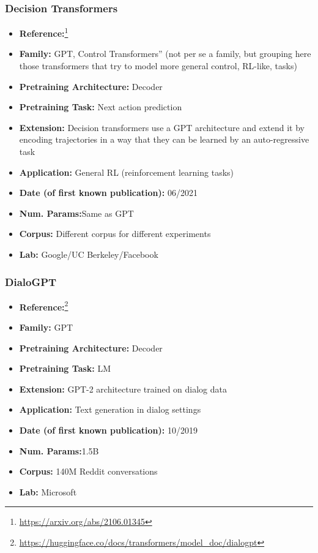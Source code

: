 \documentclass{article}
\begin{document}
\subsubsection{Decision Transformers}

            \begin{itemize}
                \item \textbf{Reference:}\footnote{\url{https://arxiv.org/abs/2106.01345}}\cite{chen2021decision}
                \item \textbf{Family:} GPT, Control Transformers” (not per se a family, but grouping here those transformers that try to model more general control, RL-like, tasks) 
                \item \textbf{Pretraining Architecture:} Decoder
                \item \textbf{Pretraining Task:} Next action prediction
                \item \textbf{Extension:} Decision transformers use a GPT architecture and extend it by encoding trajectories in a way that they can be learned by an auto-regressive task  
                \item \textbf{Application:} General RL (reinforcement learning tasks)
                \item \textbf{Date (of first known publication):} 06/2021
                \item \textbf{Num. Params:}Same as GPT
                \item \textbf{Corpus:} Different corpus for different experiments
                \item \textbf{Lab:} Google/UC Berkeley/Facebook
            \end{itemize}

\subsubsection{DialoGPT}
            \begin{itemize}
                \item \textbf{Reference:}\footnote{\url{https://huggingface.co/docs/transformers/model_doc/dialogpt}}\cite{zhang2019dialogpt}
                \item \textbf{Family:} GPT 
                \item \textbf{Pretraining Architecture:} Decoder
                \item \textbf{Pretraining Task:} LM
                \item \textbf{Extension:} GPT-2 architecture trained on dialog data  
                \item \textbf{Application:} Text generation in dialog settings
                \item \textbf{Date (of first known publication):} 10/2019
                \item \textbf{Num. Params:}1.5B
                \item \textbf{Corpus:} 140M Reddit conversations
                \item \textbf{Lab:} Microsoft
            \end{itemize}
            
\end{document}
